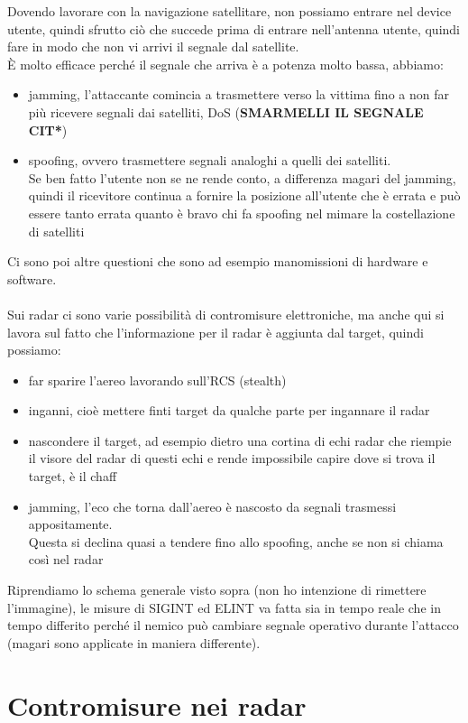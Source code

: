 \documentclass[oneside, 12pt]{extbook}
\begin{document}
Dovendo lavorare con la navigazione satellitare, non possiamo entrare nel device utente, quindi sfrutto ciò che succede prima di entrare nell'antenna utente, quindi fare in modo che non vi arrivi il segnale dal satellite.\\
È molto efficace perché il segnale che arriva è a potenza molto bassa, abbiamo:
\begin{itemize}
	\item jamming, l'attaccante comincia a trasmettere verso la vittima fino a non far più ricevere segnali dai satelliti, DoS (\textbf{SMARMELLI IL SEGNALE CIT*})
	\item spoofing, ovvero trasmettere segnali analoghi a quelli dei satelliti.\\
	Se ben fatto l'utente non se ne rende conto, a differenza magari del jamming, quindi il ricevitore continua a fornire la posizione all'utente che è errata e può essere tanto errata quanto è bravo chi fa spoofing nel mimare la costellazione di satelliti
\end{itemize}
Ci sono poi altre questioni che sono ad esempio manomissioni di hardware e software.\\\\
Sui radar ci sono varie possibilità di contromisure elettroniche, ma anche qui si lavora sul fatto che l'informazione per il radar è aggiunta dal target, quindi possiamo:
\begin{itemize}
	\item far sparire l'aereo lavorando sull'RCS (stealth)
	\item inganni, cioè mettere finti target da qualche parte per ingannare il radar
	\item nascondere il target, ad esempio dietro una cortina di echi radar che riempie il visore del radar di questi echi e rende impossibile capire dove si trova il target, è il chaff
	\item jamming, l'eco che torna dall'aereo è nascosto da segnali trasmessi appositamente.\\
	Questa si declina quasi a tendere fino allo spoofing, anche se non si chiama così nel radar
\end{itemize}
Riprendiamo lo schema generale visto sopra (non ho intenzione di rimettere l'immagine), le misure di SIGINT ed ELINT va fatta sia in tempo reale che in tempo differito perché il nemico può cambiare segnale operativo durante l'attacco (magari sono applicate in maniera differente).\\

\section{Contromisure nei radar}
\end{document}
